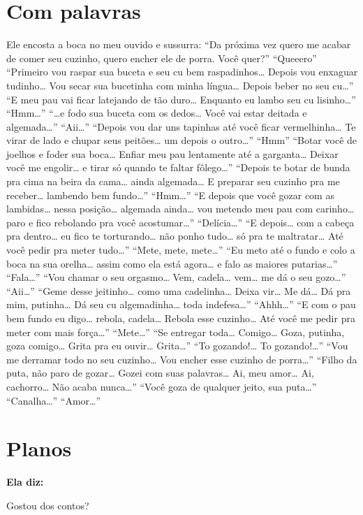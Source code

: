 \chapter{Com palavras}

Ele encosta a boca no meu ouvido e sussurra: ``Da próxima vez quero me
acabar de comer seu cuzinho, quero encher ele de porra. Você quer?''
``Queeero'' ``Primeiro vou raspar sua buceta e seu cu bem
raspadinhos… Depois vou enxaguar tudinho… Vou secar sua
bucetinha com minha língua… Depois beber no seu cu…'' ``E
meu pau vai ficar latejando de tão duro… Enquanto eu lambo seu cu
lisinho…'' ``Hmm…'' ``…e fodo sua buceta com os
dedos… Você vai estar deitada e algemada…''
``Aii…'' ``Depois vou dar uns tapinhas até você ficar
vermelhinha… Te virar de lado e chupar seus peitões… um
depois o outro…'' ``Hmm'' ``Botar você de joelhos e foder sua
boca… Enfiar meu pau lentamente até a garganta… Deixar
você me engolir… e tirar só quando te faltar fôlego…''
``Depois te botar de bunda pra cima na beira da cama… ainda
algemada… E preparar seu cuzinho pra me receber… lambendo
bem fundo…'' ``Hmm…'' ``E depois que você gozar com as
lambidas… nessa posição… algemada ainda… vou
metendo meu pau com carinho… paro e fico rebolando pra você
acostumar…'' ``Delícia…'' ``E depois… com a cabeça
pra dentro… eu fico te torturando… não ponho tudo…
só pra te maltratar… Até você pedir pra meter tudo…''
``Mete, mete, mete…'' ``Eu meto até o fundo e colo a boca na sua
orelha… assim como ela está agora… e falo as maiores
putarias…'' ``Fala…'' ``Vou chamar o seu orgasmo…
Vem, cadela… vem… me dá o seu gozo…''
``Aii…'' ``Geme desse jeitinho… como uma cadelinha…
Deixa vir… Me dá… Dá pra mim, putinha… Dá seu cu
algemadinha… toda indefesa…'' ``Ahhh…'' ``E com o
pau bem fundo eu digo… rebola, cadela… Rebola esse
cuzinho… Até você me pedir pra meter com mais força…''
``Mete…'' ``Se entregar toda… Comigo… Goza,
putinha, goza comigo… Grita pra eu ouvir… Grita…''
``To gozando!… To gozando!…'' ``Vou me derramar todo no
seu cuzinho… Vou encher esse cuzinho de porra…'' ``Filho
da puta, não paro de gozar… Gozei com suas palavras… Ai,
meu amor… Ai, cachorro… Não acaba nunca…'' ``Você
goza de qualquer jeito, sua puta…'' ``Canalha…''
``Amor…''

\chapter{Planos}

\mbox{}\indent{}\textbf{Ela diz:} 

Gostou dos contos?


